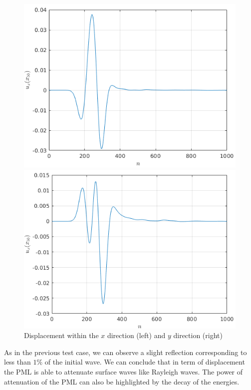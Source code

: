 \begin{figure}[H]
\centering
\begin{minipage}{.5\textwidth}
  \centering
  \includegraphics[width=.9\linewidth]{images/Lamb_disp_x_imp.png}
\end{minipage}%
\begin{minipage}{.5\textwidth}
  \centering
  \includegraphics[width=.9\linewidth]{images/Lamb_disp_y_imp.png}
\end{minipage}
\caption{Displacement within the $x$ direction (left) and $y$ direction (right)}
\label{fig:Lamb_disp_imp_pml}
\end{figure} 
As in the previous test case, we can observe a slight reflection corresponding to less than $1\%$ of the initial wave. We can conclude that in term of displacement the PML is able to attenuate surface waves like Rayleigh waves.
The power of attenuation of the PML can also be highlighted by the decay of the energies.
